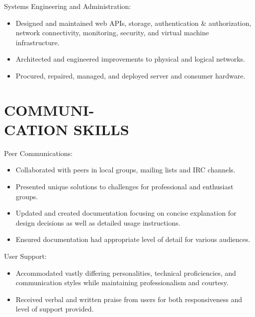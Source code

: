 \documentclass[line,margin]{res}
\begin{document}
\begin{resume}
    Systems Engineering and Administration:
    \vspace{1 mm}
    \begin{itemize}
        \itemsep -1.5pt %
        \item Designed and maintained web APIs, storage, authentication \&
            authorization, network connectivity, monitoring, security, and
            virtual machine infrastructure.
        \item Architected and engineered improvements to physical and
            logical networks.
        \item Procured, repaired, managed, and deployed server and
            consumer hardware.
    \end{itemize}

\section{COMMUNI- \\ CATION SKILLS}

    Peer Communications:
    \vspace{1 mm}
    \begin{itemize}
        \itemsep -1.5pt %
        \item Collaborated with peers in local groups, mailing lists and
        IRC channels.
        \item Presented unique solutions to challenges for professional
        and enthusiast groups.
        \item Updated and created documentation focusing on concise
        explanation for design decisions as well as detailed usage
        instructions.
        \item Ensured documentation had appropriate level of detail for
        various audiences.
    \end{itemize}
    \vspace{-3 mm}

    User Support:
    \vspace{1 mm}
    \begin{itemize}
        \itemsep -1.5pt %
        \item Accommodated vastly differing personalities, technical
        proficiencies, and communication styles while maintaining
        professionalism and courtesy.
        \item Received verbal and written praise from users for both
        responsiveness and level of support provided.
    \end{itemize}








\end{resume}
\end{document}

